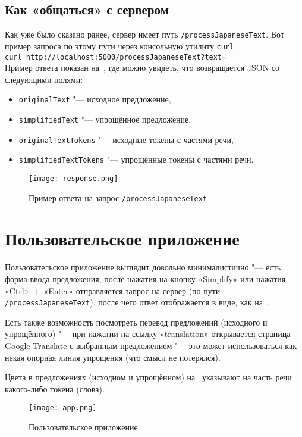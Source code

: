 \subsection{Как «общаться» с сервером}


Как уже было сказано ранее, сервер имеет путь \texttt{/processJapaneseText}.
Вот пример запроса по этому пути через консольную утилиту \texttt{curl}: \\ 
\texttt{curl http://localhost:5000/processJapaneseText?text=} \\ 
Пример ответа показан на~, где можно увидеть, что возвращается JSON со следующими полями:
\begin{itemize}%
  \item \texttt{originalText} "--- исходное предложение,
  \item \texttt{simplifiedText} "--- упрощённое предложение,
  \item \texttt{originalTextTokens} "--- исходные токены с частями речи,
  \item \texttt{simplifiedTextTokens} "--- упрощённые токены с частями речи.
\end{itemize}
\begin{figure}[H]%
  \centering
  \texttt{[image: response.png]}
  \caption{Пример ответа на запрос \texttt{/processJapaneseText}}
  \label{response}
\end{figure}


\section{Пользовательское приложение}


Пользовательское приложение выглядит довольно минималистично "--- есть форма ввода предложения, после нажатия на кнопку «Simplify» или нажатия «Ctrl»~+~«Enter» отправляется запрос на сервер (по пути \texttt{/processJapaneseText}), после чего ответ отображается в виде, как на~.

Есть также возможность посмотреть перевод предложений (исходного и упрощённого) "--- при нажатии на ссылку «translation» открывается страница Google Translate с выбранным предложением "--- это может использоваться как некая опорная линия упрощения (что смысл не потерялся).

Цвета в предложениях (исходном и упрощённом) на~ указывают на часть речи какого-либо токена (слова).

\begin{figure}[H]%
  \centering
  \texttt{[image: app.png]}
  \caption{Пользовательское приложение}
  \label{app-screen}
\end{figure}
